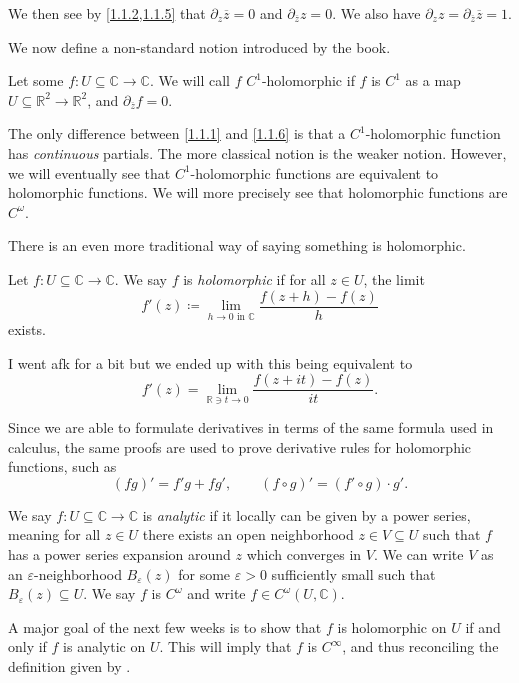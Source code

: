 We then see by \cref{1.1.2,1.1.5} that $\partial _{z} \overline{z} =0$ and $\partial _{\overline{z} } z=0$. We also have $\partial _zz=\partial _{\overline{z} } \overline{z} =1$.

We now define a non-standard notion introduced by the book.
\begin{definition}\label{1.1.6}
	Let some $f : U\subseteq \mathbb{C}  \to \mathbb{C}$. We will call $f$ $C^1$-holomorphic if $f$ is $C^1$ as a map $U\subseteq \mathbb{R} ^2\to \mathbb{R} ^2$, and $\partial _{\overline{z} } f=0$.
\end{definition}
The only difference between \cref{1.1.1} and \cref{1.1.6} is that a $C^1$-holomorphic function has \emph{continuous} partials. The more classical notion is the weaker notion. However, we will eventually see that $C^1$-holomorphic functions are equivalent to holomorphic functions. We will more precisely see that holomorphic functions are $C^\omega $.

There is an even more traditional way of saying something is holomorphic.

\begin{definition}\label{1.1.7}
	Let $f : U\subseteq \mathbb{C}  \to \mathbb{C} $. We say $f$ is \emph{holomorphic} if for all $z\in U$, the limit
			\[
				f'(z)\coloneqq \lim_{h\to 0\text{ in }\mathbb{C} } \frac{f(z+h)-f(z)}{h} 
			\]
			exists.
\end{definition}

I went afk for a bit but we ended up with this being equivalent to
\[
	f'(z)=\lim_{\mathbb{R} \ni t\to 0} \frac{f(z+it)-f(z)}{it} 
.\]

Since we are able to formulate derivatives in terms of the same formula used in calculus, the same proofs are used to prove derivative rules for holomorphic functions, such as
\[
	(fg)'=f'g+fg',\qquad (f\circ g)'=(f'\circ g)\cdot g'
.\]

\begin{definition}\label{1.1.8}
	We say $f : U\subseteq \mathbb{C}  \to \mathbb{C} $ is \emph{analytic} if it locally can be given by a power series, meaning for all $z\in U$ there exists an open neighborhood $z\in V\subseteq U$ such that $f$ has a power series expansion around $z$ which converges in $V$. We can write $V$ as an $\varepsilon $-neighborhood $B_\varepsilon (z)$ for some $\varepsilon >0$ sufficiently small such that $B_\varepsilon (z)\subseteq U$. We say $f$ is $C^\omega $ and write $f\in C^\omega (U,\mathbb{C} )$.
\end{definition}

A major goal of the next few weeks is to show that $f$ is holomorphic on $U$ if and only if $f$ is analytic on $U$. This will imply that $f$ is $C^\infty $, and thus reconciling the definition given by \cite{greene-krantz}.
